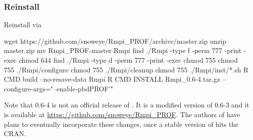 \subsubsection{Reinstall }
\label{sec:Rmpi}

Reinstall  via
\begin{Command}
wget https://github.com/snoweye/Rmpi_PROF/archive/master.zip
unzip master.zip
mv Rmpi_PROF-master Rmpi
find ./Rmpi -type f -perm 777 -print -exec chmod 644 {} \;
find ./Rmpi -type d -perm 777 -print -exec chmod 755 {} \;
chmod 755 ./Rmpi/configure
chmod 755 ./Rmpi/cleanup
chmod 755 ./Rmpi/inst/*.sh
R CMD build --no-resave-data Rmpi
R CMD INSTALL Rmpi_0.6-4.tar.gz --configure-args="--enable-pbdPROF'"
\end{Command}
Note that {\color{red} 0.6-4} is not an official release of .
It is a modified version of 0.6-3 and it is available at
\url{https://github.com/snoweye/Rmpi_PROF}.  The authors of  have plans 
to eventually incorporate these changes, once a stable version of 
hits the CRAN.
